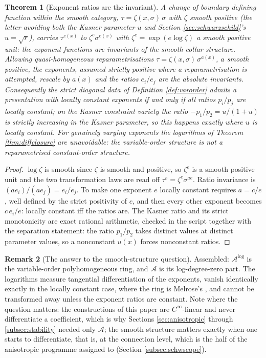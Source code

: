 \documentclass[11pt]{article}
\newtheorem{theorem}{Theorem}[section]
\theoremstyle{definition}
\newtheorem{remark}[theorem]{Remark}
\begin{document}
\begin{theorem}[Exponent ratios are the invariant]\label{thm:ratios}
A change of boundary defining function within the smooth category, $\tau = \zeta(x,\sigma)\,\sigma$ with $\zeta$ smooth positive (the letter avoiding both the Kasner parameter $u$ and Section \ref{sec:schwarzschild}'s $u = \sqrt r$), carries $\tau^{e(x)}$ to $\zeta^{e}\sigma^{e(x)}$ with $\zeta^{e} = \exp(e\log \zeta)$ a smooth positive unit: the exponent functions are invariants of the smooth collar structure. Allowing quasi-homogeneous reparametrisations $\tau = \zeta(x,\sigma)\,\sigma^{a(x)}$, $a$ smooth positive, the exponents, assumed strictly positive where a reparametrisation is attempted, rescale by $a(x)$ and the \emph{ratios} $e_i/e_j$ are the absolute invariants. Consequently the strict diagonal data of Definition \ref{def:varorder} admits a presentation with locally constant exponents if and only if all ratios $p_i/p_j$ are locally constant; on the Kasner constraint variety the ratio $-p_1/p_2 = u/(1+u)$ is strictly increasing in the Kasner parameter, so this happens exactly where $u$ is locally constant. For genuinely varying exponents the logarithms of Theorem \ref{thm:diffclosure} are unavoidable: the variable-order structure is not a reparametrised constant-order structure.
\end{theorem}

\begin{proof}
$\log \zeta$ is smooth since $\zeta$ is smooth and positive, so $\zeta^{e}$ is a smooth positive unit and the two transformation laws are read off $\tau^{e} = \zeta^{e}\sigma^{ae}$. Ratio invariance is $(a e_i)/(a e_j) = e_i/e_j$. To make one exponent $e$ locally constant requires $a = c/e$, well defined by the strict positivity of $e$, and then every other exponent becomes $c\,e_i/e$: locally constant iff the ratios are. The Kasner ratio and its strict monotonicity are exact rational arithmetic, checked in the script together with the separation statement: the ratio $p_1/p_2$ takes distinct values at distinct parameter values, so a nonconstant $u(x)$ forces nonconstant ratios.
\end{proof}

\begin{remark}[The answer to the smooth-structure question]\label{rem:phganswer}
Assembled: $\mathcal{A}^{\log}$ is the variable-order polyhomogeneous ring, and $\mathcal{A}$ is its log-degree-zero part. The logarithms measure tangential differentiation of the exponents, vanish identically exactly in the locally constant case, where the ring is Melrose's \cite{Melrose1993}, and cannot be transformed away unless the exponent ratios are constant. Note where the question matters: the constructions of this paper are $C^\infty$-linear and never differentiate a coefficient, which is why Sections \ref{sec:anisotropic} through \ref{subsec:stability} needed only $\mathcal{A}$; the smooth structure matters exactly when one starts to differentiate, that is, at the connection level, which is the half of the anisotropic programme assigned to \cite{ButlerT6} (Section \ref{subsec:schwscope}).
\end{remark}
\end{document}
